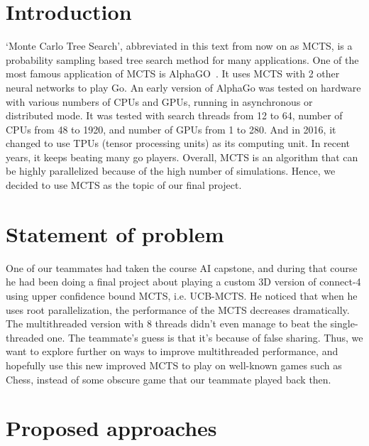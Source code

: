\documentclass[sigconf]{acmart}
\begin{document}
\maketitle

\section{Introduction}
`Monte Carlo Tree Search', abbreviated in this text from now on as MCTS, is a probability sampling based tree search method for many applications. One of the most famous application of MCTS is AlphaGO~\cite{alphaGo}. It uses MCTS with 2 other neural networks to play Go. An early version of AlphaGo was tested on hardware with various numbers of CPUs and GPUs, running in asynchronous or distributed mode. It was tested with search threads from 12 to 64, number of CPUs from 48 to 1920, and number of GPUs from 1 to 280. And in 2016, it changed to use TPUs (tensor processing units) as its computing unit. In recent years, it keeps beating many go players. Overall, MCTS is an algorithm that can be highly parallelized because of the high number of simulations. Hence, we decided to use MCTS as the topic of our final project.

\section{Statement of problem}
One of our teammates had taken the course AI capstone, and during that course he had been doing a final project about playing a custom 3D version of connect-4 using upper confidence bound MCTS, i.e. UCB-MCTS. He noticed that when he uses root parallelization, the performance of the MCTS decreases dramatically. The multithreaded version with 8 threads didn't even manage to beat the single-threaded one. The teammate's guess is that it's because of false sharing. Thus, we want to explore further on ways to improve multithreaded performance, and hopefully use this new improved MCTS to play on well-known games such as Chess, instead of some obscure game that our teammate played back then.\\


\section{Proposed approaches}
\end{document}
